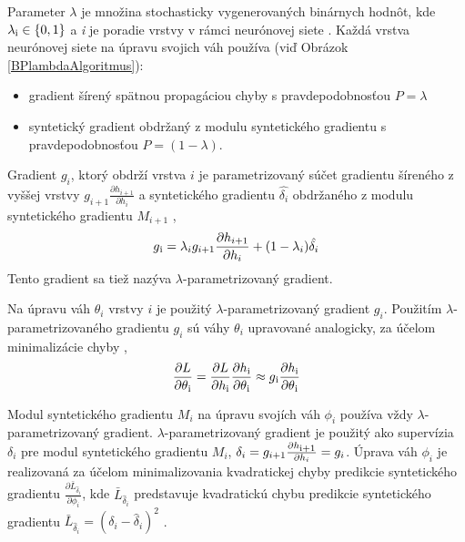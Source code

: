 Parameter $\lambda$ je množina stochasticky vygenerovaných binárnych hodnôt, kde $\lambda\textsubscript{i}\in\{0, 1\}$ a \textit{i} je poradie vrstvy v rámci neurónovej siete \cite{Jaderberg2016}. Každá vrstva neurónovej siete na úpravu svojich váh používa (viď Obrázok \ref{BPlambdaAlgoritmus}):
\begin{itemize}
    \item gradient šírený spätnou propagáciou chyby s pravdepodobnosťou $P=\lambda$
    \item syntetický gradient obdržaný z modulu syntetického gradientu s pravdepodobnosťou $P=(1-\lambda)$.
\end{itemize}
Gradient $g_i$, ktorý obdrží vrstva $i$ je parametrizovaný súčet gradientu šíreného z vyššej vrstvy $g_{i+1}\frac{\partial h_{i+1}}{\partial h_i}$ a syntetického gradientu $\hat{\delta_i}$ obdržaného z modulu syntetického gradientu $M_{i+1}$ \cite{Jaderberg2016},
\begin{equation}
\label{lambdaParametrizedGradient}
    g\textsubscript{i}=\lambda_i g_{i+1} \frac{\partial h_{i+1}}{\partial h_i}+(1-\lambda_i)\hat{\delta_i}
\end{equation}
Tento gradient sa tiež nazýva $\lambda$-parametrizovaný gradient.

Na úpravu váh $\theta_i$ vrstvy $i$ je použitý $\lambda$-parametrizovaný gradient $g_i$. Použitím $\lambda$-parametrizovaného gradientu $g_i$ sú váhy $\theta_i$ upravované analogicky, za účelom minimalizácie chyby \cite{Jaderberg2016},
\begin{equation}
    \frac{\partial L}{\partial \theta\textsubscript{i}}=\frac{\partial L}{\partial h\textsubscript{i}}\frac{\partial h\textsubscript{i}}{\partial\theta\textsubscript{i}}\approx g\textsubscript{i}\frac{\partial h\textsubscript{i}}{\partial \theta\textsubscript{i}}
\end{equation}

Modul syntetického gradientu $M_i$ na úpravu svojích váh $\phi_{i}$ používa vždy $\lambda$-parametrizovaný gradient. $\lambda$-parametrizovaný gradient je použitý ako supervízia $\delta_i$ pre modul syntetického gradientu $M_i$, $\delta_i=g_{i+1}\frac{\partial h\textsubscript{i+1}}{\partial h_i}=g_i$. Úprava váh $\phi_i$ je realizovaná za účelom minimalizovania kvadratickej chyby predikcie syntetického gradientu $\frac{\partial\bar{L}_{\hat{\delta}_i}}{\partial\phi_i}$, kde $\bar{L}_{\hat{\delta}_i}$ predstavuje kvadratickú chybu predikcie syntetického gradientu $\bar{L}_{\hat{\delta}_i}=(\delta_i-\hat{\delta}_i)^2$ \cite{Jaderberg2016}.

